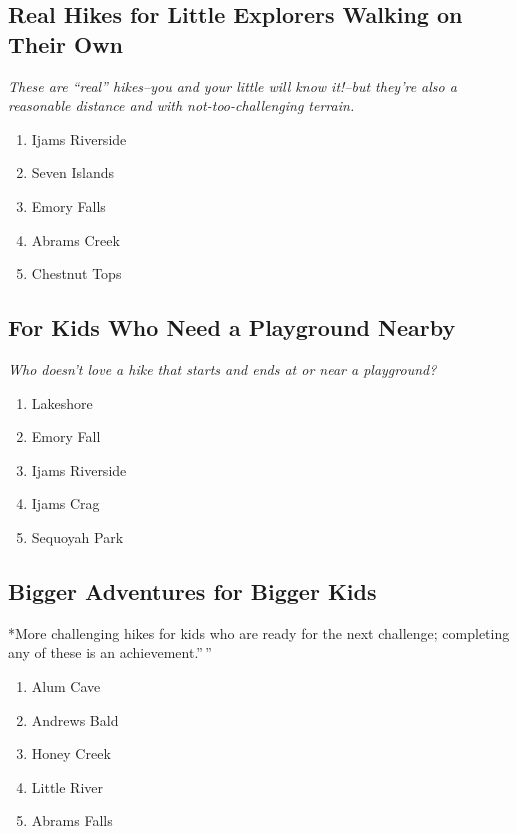 \documentclass[
  letterpaper,
  DIV=11,
  numbers=noendperiod]{scrreprt}
\providecommand{\tightlist}{%
  \setlength{\itemsep}{0pt}\setlength{\parskip}{0pt}}\usepackage{longtable,booktabs,array}
\begin{document}
\subsection{Real Hikes for Little Explorers Walking on Their
Own}\label{real-hikes-for-little-explorers-walking-on-their-own}

\emph{These are ``real'' hikes--you and your little will know it!--but
they're also a reasonable distance and with not-too-challenging
terrain.}

\begin{enumerate}
\def\labelenumi{\arabic{enumi}.}
\tightlist
\item
  Ijams Riverside
\item
  Seven Islands
\item
  Emory Falls
\item
  Abrams Creek
\item
  Chestnut Tops
\end{enumerate}

\subsection{For Kids Who Need a Playground
Nearby}\label{for-kids-who-need-a-playground-nearby}

\emph{Who doesn't love a hike that starts and ends at or near a
playground?}

\begin{enumerate}
\def\labelenumi{\arabic{enumi}.}
\tightlist
\item
  Lakeshore
\item
  Emory Fall
\item
  Ijams Riverside
\item
  Ijams Crag
\item
  Sequoyah Park
\end{enumerate}

\subsection{Bigger Adventures for Bigger
Kids}\label{bigger-adventures-for-bigger-kids}

*More challenging hikes for kids who are ready for the next challenge;
completing any of these is an achievement.''\,''

\begin{enumerate}
\def\labelenumi{\arabic{enumi}.}
\tightlist
\item
  Alum Cave
\item
  Andrews Bald
\item
  Honey Creek
\item
  Little River
\item
  Abrams Falls
\end{enumerate}
\end{document}
